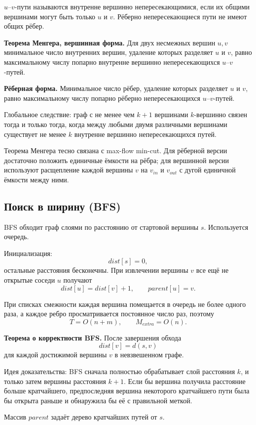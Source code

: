 $u$--$v$-пути называются внутренне вершинно непересекающимися, если их общими
вершинами могут быть только $u$ и $v$. Рёберно непересекающиеся пути не имеют
общих рёбер.

\textbf{Теорема Менгера, вершинная форма.}
Для двух несмежных вершин $u,v$ минимальное число внутренних вершин, удаление
которых разделяет $u$ и $v$, равно максимальному числу попарно внутренне
вершинно непересекающихся $u$--$v$-путей.

\textbf{Рёберная форма.}
Минимальное число рёбер, удаление которых разделяет $u$ и $v$, равно
максимальному числу попарно рёберно непересекающихся $u$--$v$-путей.

Глобальное следствие: граф с не менее чем $k+1$ вершинами $k$-вершинно связен
тогда и только тогда, когда между любыми двумя различными вершинами существует
не менее $k$ внутренне вершинно непересекающихся путей.

Теорема Менгера тесно связана с max-flow min-cut. Для рёберной версии достаточно
положить единичные ёмкости на рёбра; для вершинной версии используют расщепление
каждой вершины $v$ на $v_{in}$ и $v_{out}$ с дугой единичной ёмкости между ними.

\subsection{Поиск в ширину (BFS)}

BFS обходит граф слоями по расстоянию от стартовой вершины $s$. Используется
очередь.

Инициализация:
\[
    dist[s]=0,
\]
остальные расстояния бесконечны. При извлечении вершины $v$ все ещё не открытые
соседи $u$ получают
\[
    dist[u]=dist[v]+1,
    \qquad parent[u]=v.
\]

При списках смежности каждая вершина помещается в очередь не более одного раза,
а каждое ребро просматривается постоянное число раз, поэтому
\[
    T=O(n+m),
    \qquad
    M_{extra}=O(n).
\]

\textbf{Теорема о корректности BFS.}
После завершения обхода
\[
    dist[v]=d(s,v)
\]
для каждой достижимой вершины $v$ в невзвешенном графе.

Идея доказательства: BFS сначала полностью обрабатывает слой расстояния $k$, и
только затем вершины расстояния $k+1$. Если бы вершина получила расстояние больше
кратчайшего, предпоследняя вершина некоторого кратчайшего пути была бы открыта
раньше и обнаружила бы её с правильной меткой.

Массив $parent$ задаёт дерево кратчайших путей от $s$.

